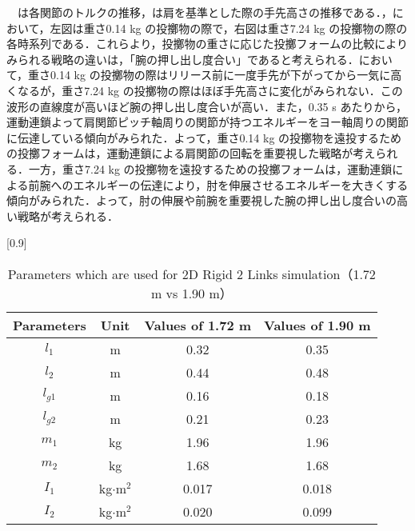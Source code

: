 　は各関節のトルクの推移，は肩を基準とした際の手先高さの推移である．，において，左図は重さ0.14 kg の投擲物の際で，右図は重さ7.24 kg の投擲物の際の各時系列である．これらより，投擲物の重さに応じた投擲フォームの比較によりみられる戦略の違いは，「腕の押し出し度合い」であると考えられる．において，重さ0.14 kg の投擲物の際はリリース前に一度手先が下がってから一気に高くなるが，重さ7.24 kg の投擲物の際はほぼ手先高さに変化がみられない．この波形の直線度が高いほど腕の押し出し度合いが高い．また，0.35 s あたりから，運動連鎖よって肩関節ピッチ軸周りの関節が持つエネルギーをヨー軸周りの関節に伝達している傾向がみられた．よって，重さ0.14 kg の投擲物を遠投するための投擲フォームは，運動連鎖による肩関節の回転を重要視した戦略が考えられる．一方，重さ7.24 kg の投擲物を遠投するための投擲フォームは，運動連鎖による前腕へのエネルギーの伝達により，肘を伸展させるエネルギーを大きくする傾向がみられた．よって，肘の伸展や前腕を重要視した腕の押し出し度合いの高い戦略が考えられる．
\begin{table}[tb]
  \begin{center}
    \caption{Parameters which are used for 2D Rigid 2 Links simulation（1.72 m vs 1.90 m）}
    \scalebox{0.9}[0.9]{
    \begin{tabular}{c|c|c|c}
      \hline
      Parameters & Unit & Values of 1.72 m & Values of 1.90 m \\
      \hline
      $l_{1}$ & m & 0.32 & 0.35 \\
      $l_{2}$ & m & 0.44 & 0.48 \\
      $l_{g1}$ & m & 0.16 & 0.18 \\
      $l_{g2}$ & m & 0.21 & 0.23 \\
      $m_{1}$ & kg & 1.96 & 1.96\\
      $m_{2}$ & kg & 1.68 & 1.68\\
      $I_{1}$ & kg$\cdot$$\mathrm{m}^2$ & 0.017 & 0.018 \\
      $I_{2}$ & kg$\cdot$$\mathrm{m}^2$ & 0.020 & 0.099 \\
      \hline
    \end{tabular}
    }
  \end{center}
\end{table}

